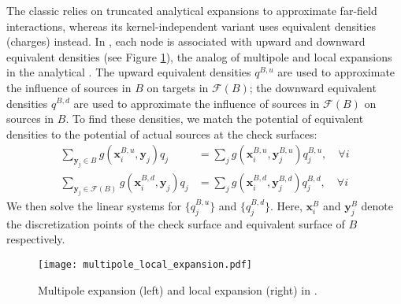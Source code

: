 The classic \fmm \cite{greengard1987fast, cheng1999fast} relies on truncated analytical expansions to approximate far-field interactions, whereas its kernel-independent variant \cite{ying2004kernel} uses equivalent densities (charges) instead.
In \kifmm, each node is associated with upward and downward equivalent densities (see Figure \ref{fig:multipole_local}), the analog of multipole and local expansions in the analytical \fmm.
The upward equivalent densities $q^{B,u}$ are used to approximate the influence of sources in $B$ on targets in $\mathcal{F}(B)$;
the downward equivalent densities $q^{B,d}$ are used to approximate the influence of sources in $\mathcal{F}(B)$ on sources in $B$.
To find these densities, we match the potential of equivalent densities to the potential of actual sources at the check surfaces:
%
\begin{align}\label{eq:multipole_local}
    \sum_{\mathbf{y}_{j} \in B} g\left(\mathbf{x}_{i}^{B,u}, \mathbf{y}_{j}\right) q_{j} &= \sum_{j} g\left(\mathbf{x}_{i}^{B,u}, \mathbf{y}^{B,u}_{j}\right) q^{B,u}_{j}, \quad \forall i  \nonumber \\
    \sum_{\mathbf{y}_{j} \in \mathcal{F}(B)} g\left(\mathbf{x}_{i}^{B,d}, \mathbf{y}_{j}\right) q_{j} &= \sum_{j} g\left(\mathbf{x}_{i}^{B,d}, \mathbf{y}^{B,d}_{j}\right) q^{B,d}_{j}, \quad \forall i
\end{align}
%
We then solve the linear systems for $\{q^{B,u}_{j}\}$ and $\{q^{B,d}_{j}\}$.
Here, $\mathbf{x}_{i}^{B}$ and $\mathbf{y}_{j}^{B}$ denote the discretization points of the check surface and equivalent surface of $B$ respectively.

\begin{figure}
    \centering
    \texttt{[image: multipole\_local\_expansion.pdf]}
    \caption{Multipole expansion (left) and local expansion (right) in \kifmm.}
    \label{fig:multipole_local}
\end{figure}

